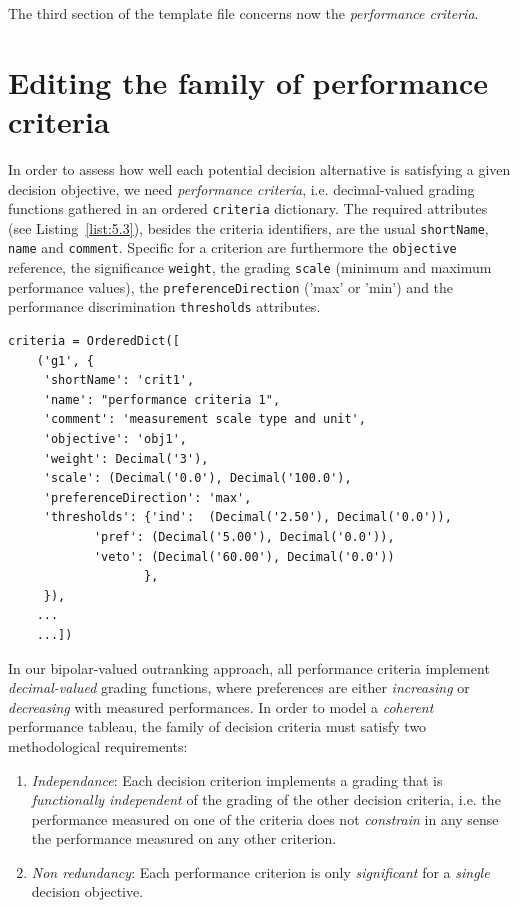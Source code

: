 The third section of the template file concerns now the \emph{performance criteria}.

\section{Editing the family of performance criteria}
\label{sec:5.4}

In order to assess how well each potential decision alternative is satisfying a given decision objective, we need \emph{performance criteria}, i.e. decimal-valued grading functions gathered in an ordered \texttt{criteria} dictionary. The required attributes (see Listing~\vref{list:5.3}), besides the criteria identifiers, are the usual \texttt{shortName}, \texttt{name} and \texttt{comment}. Specific for a criterion are furthermore the \texttt{objective} reference, the significance \texttt{weight}, the grading \texttt{scale} (minimum and  maximum performance values), the \texttt{preferenceDirection} ('max' or 'min') and the performance discrimination \texttt{thresholds} attributes.
\begin{lstlisting}[caption={Example of performance criteria description},label=list:5.3]
   criteria = OrderedDict([
    ('g1', {
     'shortName': 'crit1',
     'name': "performance criteria 1",
     'comment': 'measurement scale type and unit',
     'objective': 'obj1',
     'weight': Decimal('3'),
     'scale': (Decimal('0.0'), Decimal('100.0'),
     'preferenceDirection': 'max',
     'thresholds': {'ind':  (Decimal('2.50'), Decimal('0.0')),
		    'pref': (Decimal('5.00'), Decimal('0.0')),
		    'veto': (Decimal('60.00'), Decimal('0.0'))
                   },
     }),
    ...
    ...])
\end{lstlisting}

In our bipolar-valued outranking approach, all performance criteria implement \emph{decimal-valued} grading functions, where preferences are either \emph{increasing} or \emph{decreasing} with measured performances. In order to model a \emph{coherent} performance tableau, the family of decision criteria must satisfy two methodological requirements:
\begin{enumerate}[leftmargin=1cm]
  \item \emph{Independance}: Each decision criterion implements a grading that is \emph{functionally independent} of the grading of the other decision criteria, i.e. the performance measured on one of the criteria does not \emph{constrain} in any sense the performance measured on any other criterion.
  \item \emph{Non redundancy}: Each performance criterion is only \emph{significant} for a \emph{single} decision objective.
\end{enumerate}


